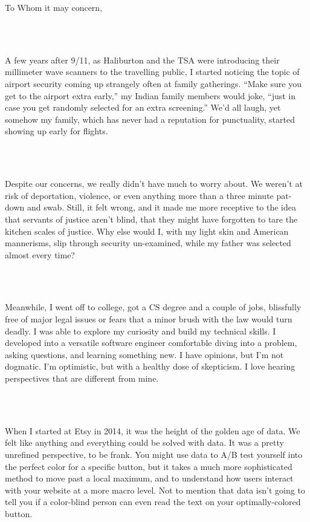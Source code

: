 \documentclass[9pt]{developercv} %
\begin{document}
\parbox{1\textwidth}{To Whom it may concern,}\\
\vspace{0.5cm}\\
\parbox{1\textwidth}{\hspace{0.75cm}A few years after 9/11, as Haliburton and the TSA were introducing their millimeter wave scanners to the travelling public, I started noticing the topic of airport security coming up strangely often at family gatherings. “Make sure you get to the airport extra early,” my Indian family members would joke, “just in case you get randomly selected for an extra screening.” We’d all laugh, yet somehow my family, which has never had a reputation for punctuality, started showing up early for flights.}\\
\vspace{0.25cm}\\
\parbox{1\textwidth}{\hspace{0.75cm}Despite our concerns, we really didn’t have much to worry about. We weren’t at risk of deportation, violence, or even anything more than a three minute pat-down and swab. Still, it felt wrong, and it made me more receptive to the idea that servants of justice aren’t blind, that they might have forgotten to tare the kitchen scales of justice. Why else would I, with my light skin and American mannerisms, slip through security un-examined, while my father was selected almost every time?}\\
\vspace{0.25cm}\\
\parbox{1\textwidth}{\hspace{0.75cm}Meanwhile, I went off to college, got a CS degree and a couple of jobs, blissfully free of major legal issues or fears that a minor brush with the law would turn deadly. I was able to explore my curiosity and build my technical skills. I developed into a versatile software engineer comfortable diving into a problem, asking questions, and learning something new. I have opinions, but I’m not dogmatic. I’m optimistic, but with a healthy dose of skepticism. I love hearing perspectives that are different from mine.}\\
\vspace{0.25cm}\\
\parbox{1\textwidth}{\hspace{0.75cm}When I started at Etsy in 2014, it was the height of the golden age of data. We felt like anything and everything could be solved with data. It was a pretty unrefined perspective, to be frank. You might use data to A/B test yourself into the perfect color for a specific button, but it takes a much more sophisticated method to move past a local maximum, and to understand how users interact with your website at a more macro level. Not to mention that data isn’t going to tell you if a color-blind person can even read the text on your optimally-colored button.}\\
\end{document}
